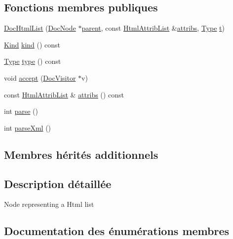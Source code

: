 \subsection*{Fonctions membres publiques}
\begin{DoxyCompactItemize}
\item 
\hyperlink{class_doc_html_list_a04842710c85b95fdd3cd5edf8666c74c}{Doc\+Html\+List} (\hyperlink{class_doc_node}{Doc\+Node} $\ast$\hyperlink{class_doc_node_a990d8b983962776a647e6231d38bd329}{parent}, const \hyperlink{class_html_attrib_list}{Html\+Attrib\+List} \&\hyperlink{class_doc_html_list_a0537b82838afb845bfd03ea0ebb9c46a}{attribs}, \hyperlink{class_doc_html_list_af05523650adffbefb14392d8f9f23487}{Type} \hyperlink{058__bracket__recursion_8tcl_a69e959f6901827e4d8271aeaa5fba0fc}{t})
\item 
\hyperlink{class_doc_node_aebd16e89ca590d84cbd40543ea5faadb}{Kind} \hyperlink{class_doc_html_list_a3fd48ae88b3ffd6958310044dd7b2776}{kind} () const 
\item 
\hyperlink{class_doc_html_list_af05523650adffbefb14392d8f9f23487}{Type} \hyperlink{class_doc_html_list_ace838ce49ccd98886ea2bd8de5867c26}{type} () const 
\item 
void \hyperlink{class_doc_html_list_aa812a843c0756a9a1f88637563b2e5fd}{accept} (\hyperlink{class_doc_visitor}{Doc\+Visitor} $\ast$v)
\item 
const \hyperlink{class_html_attrib_list}{Html\+Attrib\+List} \& \hyperlink{class_doc_html_list_a0537b82838afb845bfd03ea0ebb9c46a}{attribs} () const 
\item 
int \hyperlink{class_doc_html_list_adc33f0929fe797f0a1b25263d27bd02a}{parse} ()
\item 
int \hyperlink{class_doc_html_list_a4e520d50e258002fc3dc9996ff7cba1e}{parse\+Xml} ()
\end{DoxyCompactItemize}
\subsection*{Membres hérités additionnels}


\subsection{Description détaillée}
Node representing a Html list 

\subsection{Documentation des énumérations membres}
\hypertarget{class_doc_html_list_af05523650adffbefb14392d8f9f23487}{}
